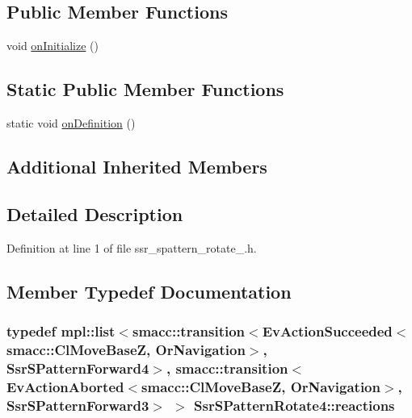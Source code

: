 \subsection*{Public Member Functions}
\begin{DoxyCompactItemize}
\item 
void \hyperlink{structSsrSPatternRotate4_aace2b26d4d2dc87438c14e0c625aeb05}{on\+Initialize} ()
\end{DoxyCompactItemize}
\subsection*{Static Public Member Functions}
\begin{DoxyCompactItemize}
\item 
static void \hyperlink{structSsrSPatternRotate4_ae63657dc25c546ffaafa01427c8f0dca}{on\+Definition} ()
\end{DoxyCompactItemize}
\subsection*{Additional Inherited Members}


\subsection{Detailed Description}


Definition at line 1 of file ssr\+\_\+spattern\+\_\+rotate\+\_.\+h.



\subsection{Member Typedef Documentation}
\subsubsection[{\texorpdfstring{reactions}{reactions}}]{\setlength{\rightskip}{0pt plus 5cm}typedef mpl\+::list$<${\bf smacc\+::transition}$<$Ev\+Action\+Succeeded$<${\bf smacc\+::\+Cl\+Move\+BaseZ}, Or\+Navigation$>$, {\bf Ssr\+S\+Pattern\+Forward4}$>$, {\bf smacc\+::transition}$<$Ev\+Action\+Aborted$<${\bf smacc\+::\+Cl\+Move\+BaseZ}, Or\+Navigation$>$, {\bf Ssr\+S\+Pattern\+Forward3}$>$ $>$ {\bf Ssr\+S\+Pattern\+Rotate4\+::reactions}}\hypertarget{structSsrSPatternRotate4_a46fc7fd9c1d25aa9b9ea6c51e31ee211}{}\label{structSsrSPatternRotate4_a46fc7fd9c1d25aa9b9ea6c51e31ee211}


